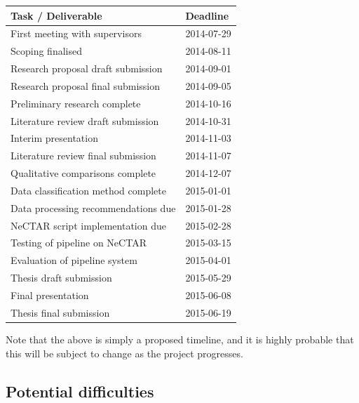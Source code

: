 \documentclass[a4paper,11pt]{article}
\begin{document}
\begin{center}
\begin{tabular}{ |l|l| }
  \hline
  \textbf{Task / Deliverable}           & \textbf{Deadline} \\ \hline
  First meeting with supervisors        & 2014-07-29        \\ \hline
  Scoping finalised                     & 2014-08-11        \\ \hline
  Research proposal draft submission    & 2014-09-01        \\ \hline
  Research proposal final submission    & 2014-09-05        \\ \hline
  Preliminary research complete         & 2014-10-16        \\ \hline
  Literature review draft submission    & 2014-10-31        \\ \hline
  Interim presentation                  & 2014-11-03        \\ \hline
  Literature review final submission    & 2014-11-07        \\ \hline
  Qualitative comparisons complete      & 2014-12-07        \\ \hline
  Data classification method complete   & 2015-01-01        \\ \hline
  Data processing recommendations due   & 2015-01-28        \\ \hline
  NeCTAR script implementation due      & 2015-02-28        \\ \hline
  Testing of pipeline on NeCTAR         & 2015-03-15        \\ \hline
  Evaluation of pipeline system         & 2015-04-01        \\ \hline
  Thesis draft submission               & 2015-05-29        \\ \hline
  Final presentation                    & 2015-06-08        \\ \hline
  Thesis final submission               & 2015-06-19        \\ \hline
\end{tabular}
\end{center}

Note that the above is simply a proposed timeline, and it is highly probable that this will be subject to change as the
project progresses.


\subsection{Potential difficulties} %
\label{sub:potential_difficulties}
\end{document}
